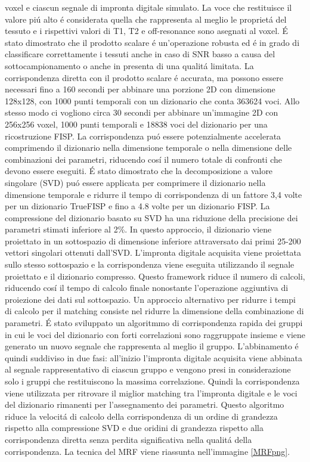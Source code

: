 \documentclass[a4paper,10pt]{article}
\begin{document}
voxel e ciascun segnale di impronta digitale simulato. La voce che restituisce il valore pi\'u alto \'e considerata quella che rappresenta al meglio le propriet\'a del tessuto e i rispettivi valori di T1, T2 e off-resonance sono asegnati al voxel. \'E stato dimostrato che il prodotto scalare \'e un'operazione robusta ed \'e in grado di classificare correttamente i tessuti anche in caso di SNR basso a causa del sottocampionamento o anche in presenta di una qualit\'a limitata. La corrispondenza diretta con il prodotto scalare \'e accurata, ma possono essere necessari fino a 160 secondi per abbinare una porzione 2D con dimensione 128x128, con 1000 punti temporali con un  dizionario che conta 363624 voci. Allo stesso modo ci vogliono circa 30 secondi per abbinare un'immagine 2D con 256x256 voxel, 1000 punti temporali e 18838 voci del dizionario per una ricostruzione FISP. La corrispondenza pu\'o essere potenzialmente accelerata comprimendo il dizionario nella dimensione temporale o nella dimensione delle combinazioni dei parametri, riducendo cos\'i il numero totale di confronti che devono essere eseguiti. \'E stato dimostrato che la decomposizione a valore singolare (SVD) pu\'o essere applicata per comprimere il dizionario nella dimensione temporale e ridurre il tempo di corrispondenza di un fattore 3,4 volte per un dizionario TrueFISP e fino a 4.8 volte per un dizionario FISP. La compressione del dizionario basato su SVD ha una riduzione della precisione dei parametri stimati inferiore al 2\%. In questo approccio, il dizionario viene proiettato in un sottospazio di dimensione inferiore attraversato dai primi 25-200 vettori singolari ottenuti dall'SVD. L'impronta digitale acquisita viene proiettata sullo stesso sottospazio e la corrispondenza viene eseguita utilizzando il segnale proiettato e il dizionario compresso. Questo framework riduce il numero di calcoli, riducendo cos\'i il tempo di calcolo finale nonostante l'operazione aggiuntiva di proiezione dei dati sul sottospazio. Un approccio alternativo per ridurre i tempi di calcolo per il matching consiste nel ridurre la dimensione della combinazione di parametri. \'E stato sviluppato un algoritmmo di corrispondenza rapida dei gruppi in cui le voci del dizionario con forti correlazioni sono raggruppate insieme e viene generato un nuovo segnale che rappresenta al meglio il gruppo. L'abbinamento \'e quindi suddiviso in due fasi: all'inizio  l'impronta digitale acquisita viene abbinata al segnale rappresentativo di ciascun gruppo e vengono presi in considerazione solo i gruppi che restituiscono la massima correlazione. Quindi la corrispondenza viene utilizzata per ritrovare il miglior matching tra l'impronta digitale e le voci del dizionario rimanenti per l'assegnamento dei parametri. Questo algoritmo riduce la velocit\'a di calcolo della corrispondenza di un ordine di grandezza rispetto alla compressione SVD e due oridini di grandezza rispetto alla corrispondenza diretta senza perdita significativa nella qualit\'a della corrispondenza. 
 La tecnica del MRF viene riassunta nell'immagine \ref{MRFpng}.
 
\end{document}
